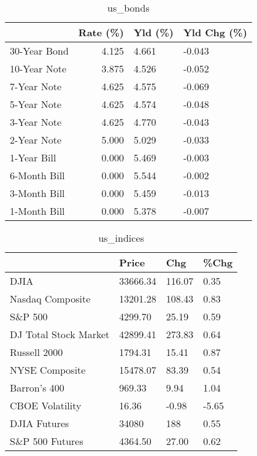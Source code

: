 \documentclass{article}%
\begin{document}
\begin{table}[htbp]%
\caption{us\_bonds}%
\centering%
\begin{adjustbox}{width=1\textwidth}%
\begin{tabular}{lrll}
\toprule
             &  Rate (\%) & Yld (\%) & Yld Chg (\%) \\
\midrule
30-Year Bond &     4.125 &   4.661 &      -0.043 \\
10-Year Note &     3.875 &   4.526 &      -0.052 \\
 7-Year Note &     4.625 &   4.575 &      -0.069 \\
 5-Year Note &     4.625 &   4.574 &      -0.048 \\
 3-Year Note &     4.625 &   4.770 &      -0.043 \\
 2-Year Note &     5.000 &   5.029 &      -0.033 \\
 1-Year Bill &     0.000 &   5.469 &      -0.003 \\
6-Month Bill &     0.000 &   5.544 &      -0.002 \\
3-Month Bill &     0.000 &   5.459 &      -0.013 \\
1-Month Bill &     0.000 &   5.378 &      -0.007 \\
\bottomrule
\end{tabular}
%
\end{adjustbox}%
\end{table}

%


\begin{table}[htbp]%
\caption{us\_indices}%
\centering%
\begin{adjustbox}{width=1\textwidth}%
\begin{tabular}{llll}
\toprule
                      &    Price &    Chg &  \%Chg \\
\midrule
                 DJIA & 33666.34 & 116.07 &  0.35 \\
     Nasdaq Composite & 13201.28 & 108.43 &  0.83 \\
              S\&P 500 &  4299.70 &  25.19 &  0.59 \\
DJ Total Stock Market & 42899.41 & 273.83 &  0.64 \\
         Russell 2000 &  1794.31 &  15.41 &  0.87 \\
       NYSE Composite & 15478.07 &  83.39 &  0.54 \\
         Barron's 400 &   969.33 &   9.94 &  1.04 \\
      CBOE Volatility &    16.36 &  -0.98 & -5.65 \\
         DJIA Futures &    34080 &    188 &  0.55 \\
      S\&P 500 Futures &  4364.50 &  27.00 &  0.62 \\
\bottomrule
\end{tabular}
%
\end{adjustbox}%
\end{table}
\end{document}
